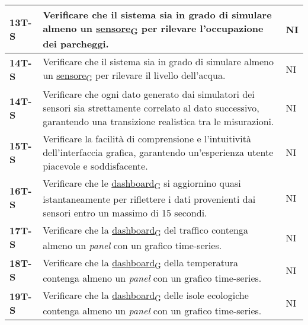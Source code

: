 \begin{longtable}{|>{\raggedright\arraybackslash}m{}|>{\raggedright\arraybackslash}m{}|>{\raggedright\arraybackslash}m{}|}
	\hline
	\textbf{13T-S}  & Verificare che il sistema sia in grado di simulare almeno un \href{https://7last.github.io/docs/rtb/documentazione-interna/glossario\#sensore}{sensore\textsubscript{G}} per rilevare l'occupazione dei parcheggi.                                                                                   & NI             \\
	\hline
	\textbf{14T-S}  & Verificare che il sistema sia in grado di simulare almeno un \href{https://7last.github.io/docs/rtb/documentazione-interna/glossario\#sensore}{sensore\textsubscript{G}} per rilevare il livello dell'acqua.                                                                                         & NI             \\
	\hline
	\textbf{14T-S}  & Verificare che ogni dato generato dai simulatori dei sensori sia strettamente correlato al dato successivo, garantendo una transizione realistica tra le misurazioni.                            & NI             \\
	\hline
	\textbf{15T-S}  & Verificare la facilità di comprensione e l'intuitività dell'interfaccia grafica, garantendo un'esperienza utente piacevole e soddisfacente.                                                      & NI             \\
	\hline
	\textbf{16T-S}  & Verificare che le \href{https://7last.github.io/docs/rtb/documentazione-interna/glossario\#dashboard}{dashboard\textsubscript{G}} si aggiornino quasi istantaneamente per riflettere i dati provenienti dai sensori entro un massimo di 15 secondi.                                                    & NI             \\
	\hline
	\textbf{17T-S}  & Verificare che la \href{https://7last.github.io/docs/rtb/documentazione-interna/glossario\#dashboard}{dashboard\textsubscript{G}} del traffico contenga almeno un \textit{panel} con un grafico time-series.                                                                                           & NI             \\
	\hline
	\textbf{18T-S}  & Verificare che la \href{https://7last.github.io/docs/rtb/documentazione-interna/glossario\#dashboard}{dashboard\textsubscript{G}} della temperatura contenga almeno un \textit{panel} con un grafico time-series.                                                                                      & NI             \\
	\hline
	\textbf{19T-S}  & Verificare che la \href{https://7last.github.io/docs/rtb/documentazione-interna/glossario\#dashboard}{dashboard\textsubscript{G}} delle isole ecologiche contenga almeno un \textit{panel} con un grafico time-series.                                                                                 & NI             \\

\end{longtable}
